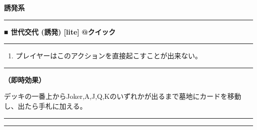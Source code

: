 \documentclass[twocolumn,a5paper,papersize,10pt]{jarticle}
\begin{document}
\begin{tcolorbox}
{\scriptsize\bf 誘発系}
\end{tcolorbox}
\vspace{-1zh}%
\vspace{2mm} %
\hrule height 0.5mm depth 0mm width 66.5mm %
\vspace{1mm} %
{\normalsize\bf ■ 世代交代 {\scriptsize (誘発) [lite]}} %
\hfill 
{\small\bf @クイック }


\vspace{1mm}%
\hrule height 0.1mm depth 0mm width 66.5mm %
\vspace{1mm}%


\vspace{-1zh}%
\begin{enumerate}
\renewcommand{\labelenumi}{※}
\setlength{\leftskip}{-0.3cm}
\setlength{\itemsep}{0pt} %
\setlength{\parskip}{0pt} %

\item プレイヤーはこのアクションを直接起こすことが出来ない。

\vspace{-3mm}%
\end{enumerate}
\vspace{1mm}%
\hrule height 0.1mm depth 0mm width 66.5mm %
\vspace{1mm}%

{\bf（即時効果）}

デッキの一番上からJoker,A,J,Q,Kのいずれかが出るまで墓地にカードを移動し、出たら手札に加える。


\begin{center}
\begin{center}
\hrule height 1mm depth 0mm width 66.5mm %
\vspace{1mm}%
{\Large\bf {}}
\vspace{1mm}%
\hrule height 0.5mm depth 0mm width 66.5mm %
\end{center}
\end{center}
\vspace{-1zh}%
\end{document}
